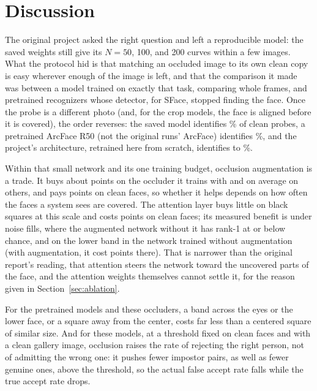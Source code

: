 \section{Discussion}

The original project asked the right question and left a reproducible model: the saved weights still give its $N=50$, 100, and 200 curves within a few images. What the protocol hid is that matching an occluded image to its own clean copy is easy wherever enough of the image is left, and that the comparison it made was between a model trained on exactly that task, comparing whole frames, and pretrained recognizers whose detector, for SFace, stopped finding the face. Once the probe is a different photo (and, for the crop models, the face is aligned before it is covered), the order reverses: the saved model identifies \% of clean probes, a pretrained ArcFace R50 (not the original runs' ArcFace) identifies \%, and the project's architecture, retrained here from scratch, identifies  to \%.

Within that small network and its one training budget, occlusion augmentation is a trade. It buys about  points on the occluder it trains with and  on average on others, and pays  points on clean faces, so whether it helps depends on how often the faces a system sees are covered. The attention layer buys little on black squares at this scale and costs  points on clean faces; its measured benefit is under noise fills, where the augmented network without it has rank-1 at or below chance, and on the lower band in the network trained without augmentation (with augmentation, it cost  points there). That is narrower than the original report's reading, that attention steers the network toward the uncovered parts of the face, and the attention weights themselves cannot settle it, for the reason given in Section~\ref{sec:ablation}.

For the pretrained models and these occluders, a band across the eyes or the lower face, or a square away from the center, costs far less than a centered square of similar size. And for these models, at a threshold fixed on clean faces and with a clean gallery image, occlusion raises the rate of rejecting the right person, not of admitting the wrong one: it pushes fewer impostor pairs, as well as fewer genuine ones, above the threshold, so the actual false accept rate falls while the true accept rate drops.
